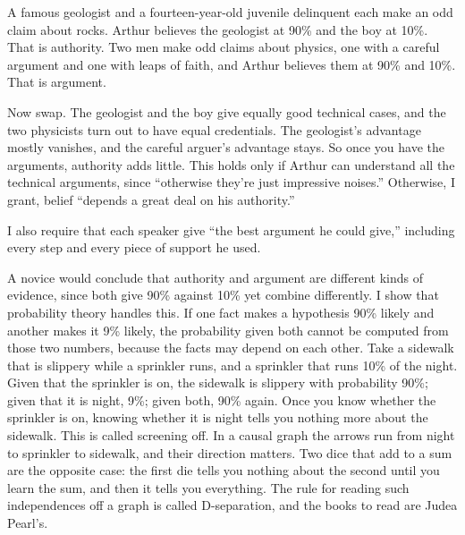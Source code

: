 
A famous geologist and a fourteen-year-old juvenile delinquent each make an odd claim about rocks. Arthur believes the geologist at 90\% and the boy at 10\%. That is authority. Two men make odd claims about physics, one with a careful argument and one with leaps of faith, and Arthur believes them at 90\% and 10\%. That is argument.

Now swap. The geologist and the boy give equally good technical cases, and the two physicists turn out to have equal credentials. The geologist's advantage mostly vanishes, and the careful arguer's advantage stays. So once you have the arguments, authority adds little. This holds only if Arthur can understand all the technical arguments, since ``otherwise they're just impressive noises.'' Otherwise, I grant, belief ``depends a great deal on his authority.'' 

I also require that each speaker give ``the best argument he could give,'' including every step and every piece of support he used. 

A novice would conclude that authority and argument are different kinds of evidence, since both give 90\% against 10\% yet combine differently. I show that probability theory handles this. If one fact makes a hypothesis 90\% likely and another makes it 9\% likely, the probability given both cannot be computed from those two numbers, because the facts may depend on each other. Take a sidewalk that is slippery while a sprinkler runs, and a sprinkler that runs 10\% of the night. Given that the sprinkler is on, the sidewalk is slippery with probability 90\%; given that it is night, 9\%; given both, 90\% again. Once you know whether the sprinkler is on, knowing whether it is night tells you nothing more about the sidewalk. This is called screening off. In a causal graph the arrows run from night to sprinkler to sidewalk, and their direction matters. Two dice that add to a sum are the opposite case: the first die tells you nothing about the second until you learn the sum, and then it tells you everything. The rule for reading such independences off a graph is called D-separation, and the books to read are Judea Pearl's. 

